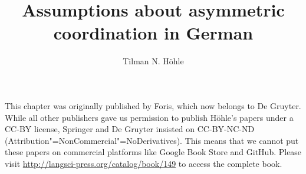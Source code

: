 \documentclass[output=paper]{LSP/langsci}
\author{Tilman N. Höhle}
\title{Assumptions about asymmetric coordination in German}
\begin{document}
\label{chap-asymmetric-coordination}

\noindent
This chapter was originally published by Foris, which now belongs to De Gruyter. While all other publishers gave us permission to publish Höhle's papers under a CC-BY
license, Springer and De Gruyter insisted on CC-BY-NC-ND (Attribution"=NonCommercial"=No\-De\-riv\-a\-tives).
This means that we cannot put these papers on commercial platforms like Google Book Store and GitHub. Please
visit \url{http://langsci-press.org/catalog/book/149} to access the complete book.



\pagebreak~
\setcounter{page}{310}
\label{chap-asymmetric-coordination-end}
\end{document}
